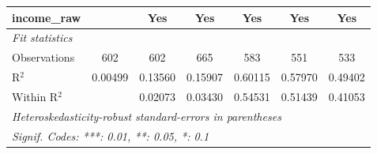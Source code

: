 \begin{tabular}{lcccccc}
   income\_raw            &               & Yes           & Yes          & Yes           & Yes          & Yes\\  
   \midrule
   \emph{Fit statistics}\\
   Observations           & 602           & 602           & 665          & 583           & 551          & 533\\  
   R$^2$                  & 0.00499       & 0.13560       & 0.15907      & 0.60115       & 0.57970      & 0.49402\\  
   Within R$^2$           &               & 0.02073       & 0.03430      & 0.54531       & 0.51439      & 0.41053\\  
   \midrule \midrule
   \multicolumn{7}{l}{\emph{Heteroskedasticity-robust standard-errors in parentheses}}\\
   \multicolumn{7}{l}{\emph{Signif. Codes: ***: 0.01, **: 0.05, *: 0.1}}\\
\end{tabular}
\par\endgroup



